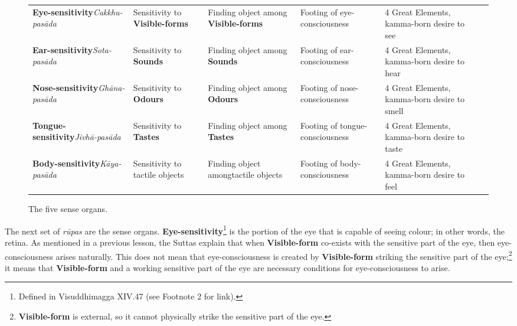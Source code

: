 \begin{figure} [H]
\setlength{\tabcolsep}{0pt}
\renewcommand{\arraystretch}{1.1}
\noindent\begin{tabular}{P{0.25\textwidth} | C{.185\textwidth} C{0.185\textwidth} C{0.185\textwidth} C{0.195\textwidth} m{0mm}}
\toprule
 &  &  &  & \\
\midrule
\textbf{Eye-sensitivity}\newline \textit{Cakkhu-pasāda} & Sensitivity to \textbf{Visible-forms} & Finding object among \textbf{Visible-forms} & Footing of eye-consciousness & 4 Great Elements, kamma-born desire to see &\\[9mm]
\textbf{Ear-sensitivity}\newline \textit{Sota-pasāda} & Sensitivity to \textbf{Sounds} & Finding object among \textbf{Sounds} & Footing of ear-consciousness & 4 Great Elements, kamma-born desire to hear &\\[9mm]
\textbf{Nose-sensitivity}\newline \textit{Ghāna-pasāda} & Sensitivity to \textbf{Odours} & Finding object among \textbf{Odours} & Footing of nose-consciousness & 4 Great Elements, kamma-born desire to smell &\\[9mm]
\textbf{Tongue-sensitivity}\newline \textit{Jivhā-pasāda} & Sensitivity to \textbf{Tastes} & Finding object among \textbf{Tastes} & Footing of tongue-consciousness & 4 Great Elements, kamma-born desire to taste &\\[9mm]
\textbf{Body-sensitivity}\newline \textit{Kāya-pasāda} & Sensitivity to tactile objects & Finding object among\newline tactile objects & Footing of body-consciousness & 4 Great Elements, kamma-born desire to feel &\\[9mm]
\bottomrule
\end{tabular}
\caption[]{The five sense organs.\footnotemark}
\end{figure}


The next set of \textit{rūpas} are the sense organs. \textbf{Eye-sensitivity}\footnote{Defined in Visuddhimagga XIV.47 (see Footnote 2 for link).} is the portion of the eye that is capable of seeing colour; in other words, the retina. As mentioned in a previous lesson, the Suttas explain that when \textbf{Visible-form} co-exists with the sensitive part of the eye, then eye-consciousness arises naturally. This does not mean that eye-consciousness is created by \textbf{Visible-form} striking the sensitive part of the eye;\footnote{\textbf{Visible-form} is external, so it cannot physically strike the sensitive part of the eye.} it means that \textbf{Visible-form} and a working sensitive part of the eye are necessary conditions for eye-consciousness to arise.

